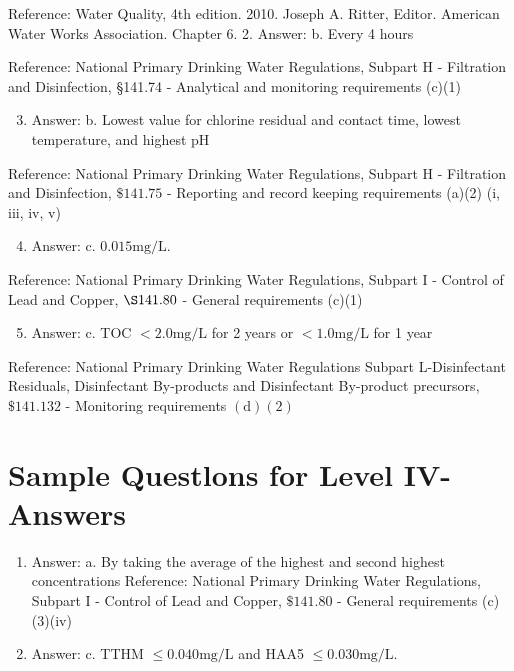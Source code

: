 \documentclass[10pt]{article}
\begin{document}
Reference: Water Quality, 4th edition. 2010. Joseph A. Ritter, Editor. American Water Works Association. Chapter 6. 2. Answer: b. Every 4 hours

Reference: National Primary Drinking Water Regulations, Subpart $\mathrm{H}$ - Filtration and Disinfection, §141.74 - Analytical and monitoring requirements (c)(1)

\begin{enumerate}
  \setcounter{enumi}{2}
  \item Answer: b. Lowest value for chlorine residual and contact time, lowest temperature, and highest $\mathrm{pH}$
\end{enumerate}

Reference: National Primary Drinking Water Regulations, Subpart $\mathrm{H}$ - Filtration and Disinfection, $\$ 141.75$ - Reporting and record keeping requirements (a)(2) (i, iii, iv, v)

\begin{enumerate}
  \setcounter{enumi}{3}
  \item Answer: c. $0.015 \mathrm{mg} / \mathrm{L}$.
\end{enumerate}

Reference: National Primary Drinking Water Regulations, Subpart I - Control of Lead and Copper, $\S 141.80$ - General requirements (c)(1)

\begin{enumerate}
  \setcounter{enumi}{4}
  \item Answer: c. TOC $<2.0 \mathrm{mg} / \mathrm{L}$ for 2 years or $<1.0 \mathrm{mg} / \mathrm{L}$ for 1 year
\end{enumerate}

Reference: National Primary Drinking Water Regulations Subpart L-Disinfectant Residuals, Disinfectant By-products and Disinfectant By-product precursors, $\$ 141.132$ - Monitoring requirements $(\mathrm{d})(2)$

\section{Sample Questlons for Level IV-Answers}
\begin{enumerate}
  \item Answer: a. By taking the average of the highest and second highest concentrations Reference: National Primary Drinking Water Regulations, Subpart I - Control of Lead and Copper, $\$ 141.80$ - General requirements (c)(3)(iv)

  \item Answer: c. TTHM $\leq 0.040 \mathrm{mg} / \mathrm{L}$ and HAA5 $\leq 0.030 \mathrm{mg} / \mathrm{L}$.

\end{enumerate}
\end{document}
